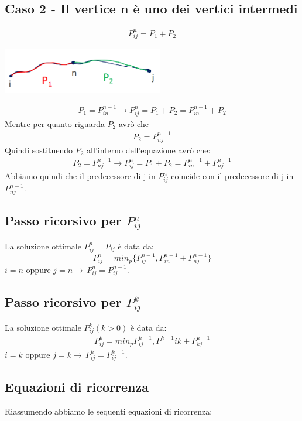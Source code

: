 \subsection*{Caso 2 - Il vertice n è uno dei vertici intermedi}
\begin{align*}
    P^n_{ij} = P_1 + P_2
\end{align*}
\begin{center}
    \includegraphics[width=70mm, scale=0.5]{chapters_ulerich/img/floyd_warshall_tent_sottostruttura_4.png}
\end{center}
\begin{align*}
    P_1 = P^{n-1}_{in} \rightarrow P^n_{ij} = P_1 + P_2 = P^{n-1}_{in} + P_2
\end{align*}
Mentre per quanto riguarda $P_2$ avrò che
\begin{align*}
    P_2 = P^{n-1}_{nj}
\end{align*}
Quindi sostituendo $P_2$ all'interno dell'equazione avrò che:
\begin{align*}
    P_2 = P^{n-1}_{nj} \rightarrow P^n_{ij} = P_1 + P_2 = P^{n-1}_{in} + P^{n-1}_{nj}
\end{align*}
Abbiamo quindi che il predecessore di j in $P^n_{ij}$ coincide con il predecessore di j in $P^{n-1}_{nj}$.\\
\subsection*{Passo ricorsivo per $P^n_{ij}$}
La soluzione ottimale $P^n_{ij} = P_{ij}$ è data da:
\[ P^n_{ij} = min_p\{P^{n-1}_{ij}, P^{n-1}_{in} + P^{n-1}_{nj}\} \]
$i = n$ oppure $j = n \rightarrow \, P^n_{ij} = P^{n-1}_{ij}$.
\subsection*{Passo ricorsivo per $P^k_{ij}$}
La soluzione ottimale $P^k_{ij} (k>0)$ è data da:
\begin{align*}
    P^k_{ij} = min_p{P^{k-1}_{ij}, P^{k-1}{ik} + P^{k-1}_{kj}}
\end{align*}
$i=k$ oppure $j=k \rightarrow \, P^k_{ij} = P^{k-1}_{ij}$.
\subsection{Equazioni di ricorrenza}
Riassumendo abbiamo le sequenti equazioni di ricorrenza:
